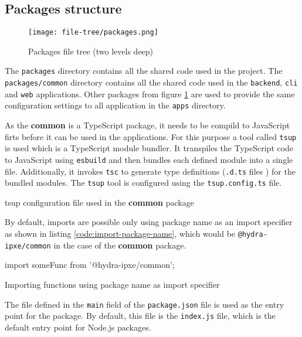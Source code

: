 \documentclass[../main.tex]{subfiles}
\begin{document}
\subsection{Packages structure}

\begin{figure}[H]
  \centering
  \texttt{[image: file-tree/packages.png]}
  \caption{Packages file tree (two levels deep)}
  \label{fig:packages-file-tree}
\end{figure}

The \texttt{packages} directory contains all the shared code used in the project.
The \texttt{packages/common} directory contains all the shared code used in the \texttt{backend}, \texttt{cli} and \texttt{web} applications.
Other packages from figure \ref{fig:packages-file-tree} are used to provide the same configuration settings to all application in the \texttt{apps} directory.

As the \textbf{common} is a TypeScript package, it needs to be compild to JavaScript firts before it can be used in the applications.
For this purpose a tool called \texttt{tsup} \cite{tsup} is used which is a TypeScript module bundler.
It transpiles the TypeScript code to JavaScript using \texttt{esbuild} \cite{esbuild} and then bundles each defined module into a single file.
Additionally, it invokes \texttt{tsc} to generate type definitions (\texttt{.d.ts} files \cite{typescript-d-ts}) for the bundled modules.
The \texttt{tsup} tool is configured using the \texttt{tsup.config.ts} file.

\begin{listing}[H]
  \caption{tsup configuration file used in the \textbf{common} package}
  \label{code:tsup-config}
\end{listing}

By default, imports are possible only using package name as an import specifier as shown in listing \ref{code:import-package-name},
which would be \texttt{@hydra-ipxe/common} in the case of the \textbf{common} package.

\begin{listing}[H]
  \begin{tscode}
    import { someFunc } from '@hydra-ipxe/common';
  \end{tscode}
  \caption{Importing functions using package name as import specifier}
  \label{code:import-package-name}
\end{listing}

The file defined in the \texttt{main} field of the \texttt{package.json} file is used as the entry point for the package.
By default, this file is the \texttt{index.js} file, which is the default entry point for Node.js packages.
\end{document}
